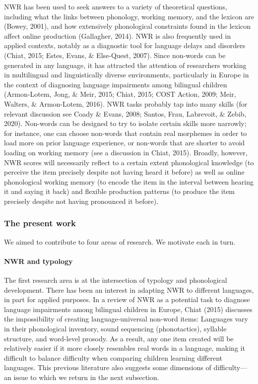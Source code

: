 \documentclass[
  american,
  ,man,floatsintext]{apa6}
\let\oldparagraph\paragraph
\renewcommand{\paragraph}[1]{\oldparagraph{#1}\mbox{}}
\begin{document}
NWR has been used to seek answers to a variety of theoretical questions, including what the links between phonology, working memory, and the lexicon are (Bowey, 2001), and how extensively phonological constraints found in the lexicon affect online production (Gallagher, 2014). NWR is also frequently used in applied contexts, notably as a diagnostic tool for language delays and disorders (Chiat, 2015; Estes, Evans, \& Else-Quest, 2007). Since non-words can be generated in any language, it has attracted the attention of researchers working in multilingual and linguistically diverse environments, particularly in Europe in the context of diagnosing language impairments among bilingual children (Armon-Lotem, Jong, \& Meir, 2015; Chiat, 2015; COST Action, 2009; Meir, Walters, \& Armon-Lotem, 2016). NWR tasks probably tap into many skills (for relevant discussion see Coady \& Evans, 2008; Santos, Frau, Labrevoit, \& Zebib, 2020). Non-words can be designed to try to isolate certain skills more narrowly; for instance, one can choose non-words that contain real morphemes in order to load more on prior language experience, or non-words that are shorter to avoid loading on working memory (see a discussion in Chiat, 2015). Broadly, however, NWR scores will necessarily reflect to a certain extent phonological knowledge (to perceive the item precisely despite not having heard it before) as well as online phonological working memory (to encode the item in the interval between hearing it and saying it back) and flexible production patterns (to produce the item precisely despite not having pronounced it before).

\hypertarget{the-present-work}{%
\subsubsection{The present work}\label{the-present-work}}

We aimed to contribute to four areas of research. We motivate each in turn.

\hypertarget{nwr-and-typology}{%
\paragraph{NWR and typology}\label{nwr-and-typology}}

The first research area is at the intersection of typology and phonological development. There has been an interest in adapting NWR to different languages, in part for applied purposes. In a review of NWR as a potential task to diagnose language impairments among bilingual children in Europe, Chiat (2015) discusses the impossibility of creating language-universal non-word items: Languages vary in their phonological inventory, sound sequencing (phonotactics), syllable structure, and word-level prosody. As a result, any one item created will be relatively easier if it more closely resembles real words in a language, making it difficult to balance difficulty when comparing children learning different languages. This previous literature also suggests some dimensions of difficulty---an issue to which we return in the next subsection.
\end{document}
